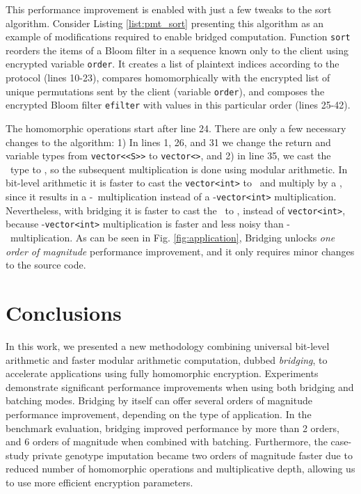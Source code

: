 This performance improvement is enabled with just a few tweaks to the sort algorithm.
Consider Listing \ref{list:pmt_sort} presenting this algorithm as an example of modifications required to enable bridged computation.
Function \texttt{sort} reorders the items of a Bloom filter in a sequence known only to the client using encrypted variable \texttt{order}. It creates a list of plaintext indices according to the protocol (lines 10-23), compares homomorphically with the encrypted list of unique permutations sent by the client (variable \texttt{order}), and composes the encrypted Bloom filter \texttt{efilter} with values in this particular order (lines 25-42).

The homomorphic operations start after line 24. There are only a few necessary changes to the algorithm: 1) In lines 1, 26, and 31 we change the return and variable types from \texttt{vector<\secuint<S>{}>} to \texttt{vector<\secmod>}, and 2) in line 35, we cast the \secbool\ type to \secmod, so the subsequent multiplication is done using modular arithmetic.
In bit-level arithmetic it is faster to cast the \texttt{vector<int>} to \secuint\ and multiply by a \secbool, since it results in a \secbool-\secuint\ multiplication instead of a \secuint-\texttt{vector<int>} multiplication. Nevertheless, with bridging it is faster to cast the \secbool\ to \secmod, instead of \texttt{vector<int>}, because \secmod-\texttt{vector<int>} multiplication is faster and less noisy than \secmod-\secmod\ multiplication.
As can be seen in Fig. \ref{fig:application}, Bridging unlocks {\it one order of magnitude} performance improvement, and it only requires minor changes to the source code.

\section{Conclusions}\label{s:conclusions}

In this work, we presented a new methodology combining universal bit-level arithmetic and faster modular arithmetic computation, dubbed \emph{bridging}, to accelerate applications using fully homomorphic encryption. Experiments demonstrate significant performance improvements when using both bridging and batching modes. Bridging by itself can offer several orders of magnitude performance improvement, depending on the type of application. In the benchmark evaluation, bridging improved performance by more than 2 orders, and 6 orders of magnitude when combined with batching. 
Furthermore, the case-study private genotype imputation became two orders of magnitude faster due to reduced number of homomorphic operations and multiplicative depth, allowing us to use more efficient encryption parameters.

